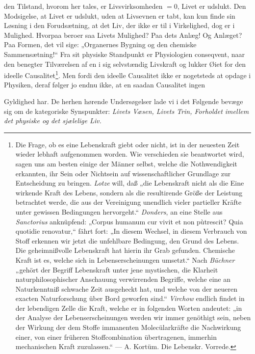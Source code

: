 \documentclass[12pt,a4paper]{book}
\begin{document}
\setcounter{footnote}{0}
den Tilstand, hvorom her tales, er Livsvirksomheden $= 0$, Livet er
udslukt. Den Modsigelse, at Livet er udslukt, uden at Livsevnen er tabt,
kan kun finde sin Løsning i den Forudsætning, at det Liv, der ikke er til
i Virkelighed, dog er i Mulighed. Hvorpaa beroer saa Livets Mulighed? Paa
dets Anlæg! Og Anlæget? Paa Formen, det vil sige: „Organernes Bygning og
den chemiske Sammensætning!“ Fra sit physiske Standpunkt er Physiologien
conseqvent, naar den benegter Tilværelsen af en i sig selvstændig
Livskraft og lukker Øiet for den ideelle
Causalitet\footnote{Die Frage, ob es eine Lebenskraft giebt oder nicht,
ist in der neuesten Zeit wieder lebhaft aufgenommen worden. Wie
verschieden sie beantwortet wird, sagen uns am besten einige der Männer
selbst, welche die Nothwendigkeit erkannten, ihr Sein oder Nichtsein auf
wissenschaftlicher Grundlage zur Entscheidung zu bringen. \emph{Lotze} will,
daß „die Lebenskraft nicht als die Eine wirkende Kraft des Lebens,
sondern als die resultirende Größe der Leistung betrachtet werde, die
aus der Vereinigung unendlich vieler partieller Kräfte unter gewissen
Bedingungen hervorgeht.“ \emph{Donders}, an eine Stelle aus
\emph{Sanctorius} anknüpfend: „Corpus humanum cur vivit et non pùtrescit? Quia quotidie
renovatur,“ fährt fort: „In diesem Wechsel, in diesem Verbrauch von
Stoff erkennen wir jetzt die unfehlbare Bedingung, den Grund des Lebens.
Die geheimnißvolle Lebenskraft hat hierin ihr Grab gefunden. Chemische
Kraft ist es, welche sich in Lebenserscheinungen umsetzt.“ Nach \emph{Büchner}
„gehört der Begriff Lebenskraft unter jene mystischen, die Klarheit
naturphilosophischer Anschauung verwirrenden Begriffe, welche eine an
Naturkenntniß schwache Zeit ausgeheckt hat, und welche von der neueren
exacten Naturforschung über Bord geworfen sind.“ \emph{Virchow} endlich findet
in der lebendigen Zelle die Kraft, welche er in folgenden Worten
andeutet: „in der Analyse der Lebenserscheinungen werden wir immer
genöthigt sein, neben der Wirkung der dem Stoffe immanenten
Molecülarkräfte die Nachwirkung einer, von einer früheren
Stoffcombination übertragenen, immerhin mechanischen Kraft
zuzulassen.“ --- A. Kortüm. Die Lebenskr. Vorrede.}. Men fordi den
ideelle Causalitet ikke er nogetsteds at opdage i Physiken, deraf følger
jo endnu ikke, at en saadan Causalitet ingen

Gyldighed har. De herhen hørende Undersøgelser lade vi i det Følgende
bevæge sig om de kategoriske Synspunkter: \emph{Livets Væsen, Livets
Trin, Forholdet imellem det physiske og det sjælelige Liv.}
\end{document}
